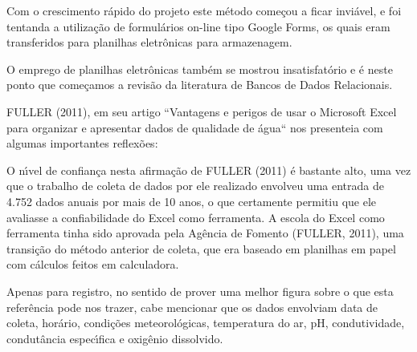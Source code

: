 \documentclass[
12pt,		%
openright,	%
twoside,  %
a4paper,			%
chapter=TITLE,		%
english,			%
french,				%
spanish,			%
brazil				%
]{USPSC-classe/USPSC_RedarTex}
\begin{document}
Com o crescimento r\'apido do projeto este m\'etodo come\c{c}ou a ficar invi\'avel, e foi tentanda a utiliza\c{c}\~ao de formul\'arios on-line tipo \textquotedbl Google Forms\textquotedbl , os quais eram transferidos para planilhas eletr\^onicas para armazenagem.








O emprego de planilhas eletr\^onicas tamb\'em se mostrou insatisfat\'orio e \'e neste ponto que come\c{c}amos a revis\~ao da literatura de Bancos de Dados Relacionais.








FULLER (2011), em seu artigo ``Vantagens e perigos de usar o Microsoft Excel para organizar e apresentar dados de qualidade de \'agua`` nos presenteia com algumas importantes reflex\~oes:









\noindent\begin{center}\mbox{\centering{}}\end{center}


O n\'{\i}vel de confian\c{c}a nesta afirma\c{c}\~ao de  FULLER (2011) \'e bastante alto, uma vez que o trabalho de coleta de dados por ele realizado envolveu uma entrada de 4.752 dados anuais por mais de 10 anos, o que certamente permitiu que ele avaliasse a confiabilidade do Excel como ferramenta. A escola do Excel como ferramenta tinha sido aprovada pela Ag\^encia de Fomento  (FULLER, 2011), uma transi\c{c}\~ao do m\'etodo anterior de coleta, que era baseado em planilhas em papel com c\'alculos feitos em calculadora.








Apenas para registro, no sentido de prover uma melhor figura sobre o que esta refer\^encia pode nos trazer, cabe mencionar que os dados envolviam data de coleta, hor\'ario, condi\c{c}\~oes meteorol\'ogicas, temperatura do ar, pH, condutividade, condut\^ancia espec\'{\i}fica e oxig\^enio dissolvido.
\end{document}
